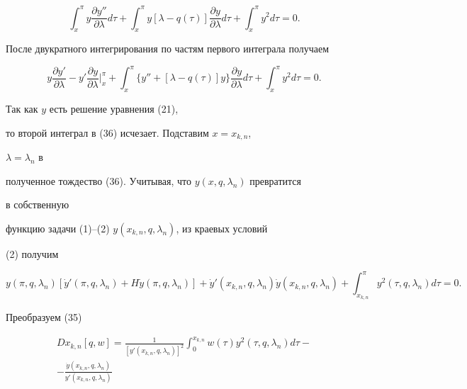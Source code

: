 \begin{pf}
$$ 


\int^\pi_x y\frac{\partial y''}{\partial\lambda}d\tau+ 


\int^\pi_x y[\lambda-q(\tau)]\frac{\partial y}{\partial\lambda}


d\tau+\int^\pi_x y^2d\tau=0. 


$$ 


После двукратного интегрирования по частям первого интеграла получаем 


\begin{equation} 


y\frac{\partial y'}{\partial\lambda}-y' 


\frac{\partial y}{\partial\lambda}\bigg|^\pi_x+ 


\int^\pi_x\{y''+[\lambda-q(\tau)]y\} 


\frac{\partial y}{\partial\lambda}d\tau+\int^\pi_x 


y^2d\tau=0. 


\end{equation} 


Так как $y$ есть решение уравнения (21), 


то второй интеграл в (36) исчезает. Подставим $x=x_{k,n}$, 


$\lambda=\lambda_n$ в 


полученное тождество (36). Учитывая, что $y(x,q,\lambda_n)$ превратится 


в собственную 


функцию задачи (1)--(2) $y(x_{k,n},q,\lambda_n)$, из краевых условий 


(2) получим 


$$ 


y(\pi,q,\lambda_n)[\Dot y'(\pi,q,\lambda_n)+ 


H\Dot y(\pi,q,\lambda_n)]+\Dot y'(x_{k,n},q,\lambda_n) 


\Dot y(x_{k,n},q,\lambda_n)+\int^\pi_{x_{k,n}} 


y^2(\tau,q,\lambda_n)d\tau=0.


$$ 


Преобразуем (35) 


\begin{multline} 


D x_{k,n}[q,w]=\frac{1}{[y'(x_{k,n},q,\lambda_n)]^2} 


\int^{x_{k,n}}_0 w(\tau)y^2(\tau,q,\lambda_n)d\tau- \\ 


% 


-\frac{\Dot y(x_{k,n},q,\lambda_n)}{y'(x_{k,n},q,\lambda_n)} 



\end{multline}
\end{pf}
